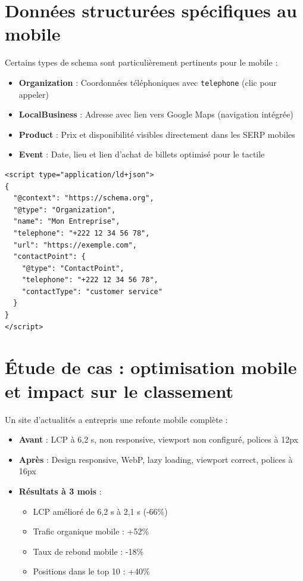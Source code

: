 \documentclass[12pt,a4paper,twoside]{report}
\begin{document}
\section{Données structurées spécifiques au mobile}

Certains types de schema sont particulièrement pertinents pour le mobile :

\begin{itemize}
    \item \textbf{Organization} : Coordonnées téléphoniques avec \texttt{telephone} (clic pour appeler)
    \item \textbf{LocalBusiness} : Adresse avec lien vers Google Maps (navigation intégrée)
    \item \textbf{Product} : Prix et disponibilité visibles directement dans les SERP mobiles
    \item \textbf{Event} : Date, lieu et lien d'achat de billets optimisé pour le tactile
\end{itemize}

\begin{lstlisting}[style=htmlcode,caption={Schema Organization optimisé pour le mobile}]
<script type="application/ld+json">
{
  "@context": "https://schema.org",
  "@type": "Organization",
  "name": "Mon Entreprise",
  "telephone": "+222 12 34 56 78",
  "url": "https://exemple.com",
  "contactPoint": {
    "@type": "ContactPoint",
    "telephone": "+222 12 34 56 78",
    "contactType": "customer service"
  }
}
</script>
\end{lstlisting}

\section{Étude de cas : optimisation mobile et impact sur le classement}

Un site d'actualités a entrepris une refonte mobile complète :

\begin{itemize}
    \item \textbf{Avant} : LCP à 6,2 s, non responsive, viewport non configuré, polices à 12px
    \item \textbf{Après} : Design responsive, WebP, lazy loading, viewport correct, polices à 16px
    \item \textbf{Résultats à 3 mois} :
    \begin{itemize}
        \item LCP amélioré de 6,2 s à 2,1 s (-66\%)
        \item Trafic organique mobile : +52\%
        \item Taux de rebond mobile : -18\%
        \item Positions dans le top 10 : +40\%
    \end{itemize}
\end{itemize}
\end{document}
